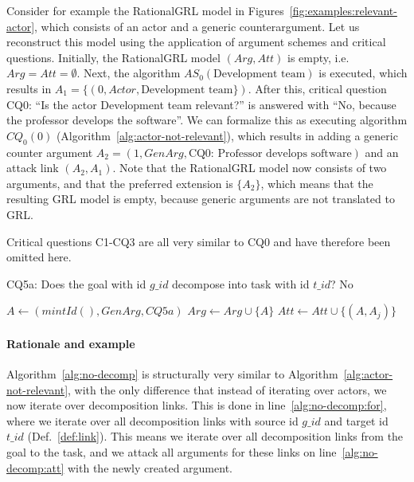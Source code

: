Consider for example the RationalGRL model in Figures~\ref{fig:examples:relevant-actor}, which consists of an actor and a generic counterargument. Let us reconstruct this model using the application of argument schemes and critical questions. Initially, the RationalGRL model $(Arg,Att)$ is empty, i.e. $Arg=Att=\emptyset$. Next, the algorithm $AS_0(\text{Development team})$ is executed, which results in $A_1=\{(0,Actor,\text{Development team}\})$. After this, critical question CQ0: ``Is the actor Development team relevant?'' is answered with ``No, because the professor develops the software''. We can formalize this as executing algorithm $CQ_0(0)$ (Algorithm~\ref{alg:actor-not-relevant}), which results in adding a generic counter argument $A_2=(1, GenArg, \text{CQ0: Professor develops software})$ and an attack link $(A_2,A_1)$. Note that the RationalGRL model now consists of two arguments, and that the preferred extension is $\{A_2\}$, which means that the resulting GRL model is empty, because generic arguments are not translated to GRL.

Critical questions C1-CQ3 are all very similar to CQ0 and have therefore been omitted here.

\begin{algorithm}[h]
  \caption{CQ5a: Does the goal with id $g\_id$ decompose into task with id $t\_id$? No}\label{alg:no-decomp}
  \begin{algorithmic}[1]
    \State $A \leftarrow (mintId(),GenArg,CQ5a)$\label{alg:no-decomp:genarg}
    \State $Arg\leftarrow Arg \cup \{A\}$\label{alg:no-decomp:genarg2}
    \label{alg:no-decomp:for}
      \State $Att \leftarrow Att \cup \{(A,A_j)\}$\label{alg:no-decomp:att}
    \EndFor
    \EndProcedure
  \end{algorithmic}
\end{algorithm}

\paragraph{Rationale and example} Algorithm~\ref{alg:no-decomp} is structurally very similar to Algorithm~\ref{alg:actor-not-relevant}, with the only difference that instead of iterating over actors, we now iterate over decomposition links. This is done in line~\ref{alg:no-decomp:for}, where we iterate over all decomposition links with source id $g\_id$ and target id $t\_id$ (Def.~\ref{def:link}). This means we iterate over all decomposition links from the goal to the task, and we attack all arguments for these links on line~\ref{alg:no-decomp:att} with the newly created argument.

